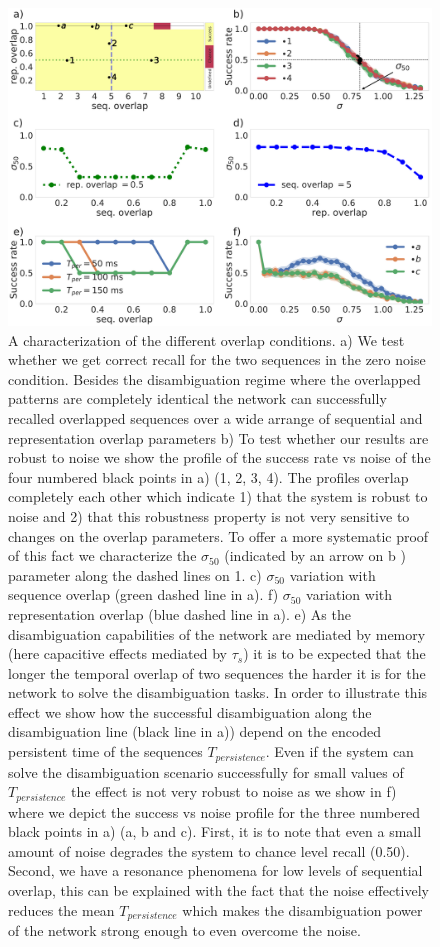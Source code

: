 \documentclass[10pt,a4paper]{article}
\begin{document}
\begin{figure}[H]
\centering
\includegraphics[scale=0.20]{representations.pdf}
\caption{A characterization of the different overlap conditions. a) We test whether we get correct recall for the two sequences in the zero noise condition. Besides the disambiguation regime where the overlapped patterns are completely identical the network can successfully recalled overlapped sequences over a wide arrange of sequential and representation overlap parameters b) To test whether our results are robust to noise we show the profile of the success rate vs noise of the four numbered black points in a) (1, 2, 3, 4). The profiles overlap completely each other which indicate 1) that the system is robust to noise and 2) that this robustness property is not very sensitive to changes on the overlap parameters. To offer a more systematic proof of this fact we  characterize the $\sigma_{50}$  (indicated by an arrow on b ) parameter along the dashed lines on 1. c) $\sigma_{50}$ variation with sequence overlap (green dashed line in a). f) $\sigma_{50}$ variation with representation overlap (blue dashed line in a). e) As the disambiguation capabilities of the network are mediated by memory (here capacitive effects mediated by $\tau_s$) it is to be expected that the longer the temporal overlap of two sequences the harder it is for the network to solve the disambiguation tasks. In order to illustrate this effect we show how the successful disambiguation along the disambiguation line (black line in a)) depend on the encoded persistent time of the sequences $T_{persistence}$. Even if the system can solve the disambiguation scenario successfully for small values of $T_{persistence}$  the effect is not very robust to noise  as we show in f) where we depict the success vs noise profile for the three numbered black points in  a) (a, b and c). First, it is to note that even a small amount of noise degrades the system to chance level recall (0.50). Second, we have a resonance phenomena for low levels of sequential overlap, this can be explained with the fact that the noise effectively reduces the mean $T_{persistence}$ which makes the disambiguation power of the network strong enough to even overcome the noise.}
\label{fig:representations}
\end{figure}
\end{document}
